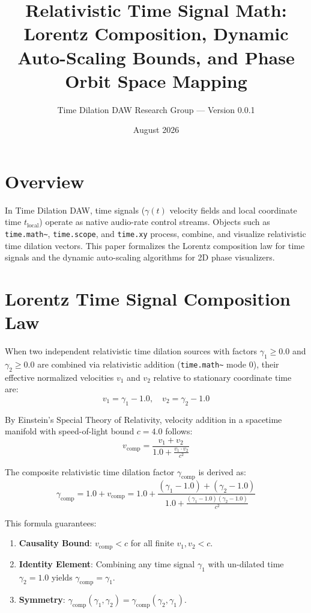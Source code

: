 \documentclass[11pt,a4paper]{article}
\title{\textbf{Relativistic Time Signal Math: Lorentz Composition, Dynamic Auto-Scaling Bounds, and Phase Orbit Space Mapping}}
\author{Time Dilation DAW Research Group --- Version 0.0.1}
\date{August 2026}
\begin{document}
\maketitle

\section{Overview}
In Time Dilation DAW, time signals ($\gamma(t)$ velocity fields and local coordinate time $t_{\text{local}}$) operate as native audio-rate control streams. Objects such as \texttt{time.math\textasciitilde}, \texttt{time.scope}, and \texttt{time.xy} process, combine, and visualize relativistic time dilation vectors. This paper formalizes the Lorentz composition law for time signals and the dynamic auto-scaling algorithms for 2D phase visualizers.

\section{Lorentz Time Signal Composition Law}
When two independent relativistic time dilation sources with factors $\gamma_1 \ge 0.0$ and $\gamma_2 \ge 0.0$ are combined via relativistic addition (\texttt{time.math\textasciitilde} mode 0), their effective normalized velocities $v_1$ and $v_2$ relative to stationary coordinate time are:
\begin{equation}
v_1 = \gamma_1 - 1.0, \quad v_2 = \gamma_2 - 1.0
\end{equation}

By Einstein's Special Theory of Relativity, velocity addition in a spacetime manifold with speed-of-light bound $c = 4.0$ follows:
\begin{equation}
v_{\text{comp}} = \frac{v_1 + v_2}{1.0 + \frac{v_1 \cdot v_2}{c^2}}
\end{equation}

The composite relativistic time dilation factor $\gamma_{\text{comp}}$ is derived as:
\begin{equation}
\gamma_{\text{comp}} = 1.0 + v_{\text{comp}} = 1.0 + \frac{(\gamma_1 - 1.0) + (\gamma_2 - 1.0)}{1.0 + \frac{(\gamma_1 - 1.0)(\gamma_2 - 1.0)}{c^2}}
\end{equation}

This formula guarantees:
\begin{enumerate}
    \item \textbf{Causality Bound}: $v_{\text{comp}} < c$ for all finite $v_1, v_2 < c$.
    \item \textbf{Identity Element}: Combining any time signal $\gamma_1$ with un-dilated time $\gamma_2 = 1.0$ yields $\gamma_{\text{comp}} = \gamma_1$.
    \item \textbf{Symmetry}: $\gamma_{\text{comp}}(\gamma_1, \gamma_2) = \gamma_{\text{comp}}(\gamma_2, \gamma_1)$.
\end{enumerate}
\end{document}
